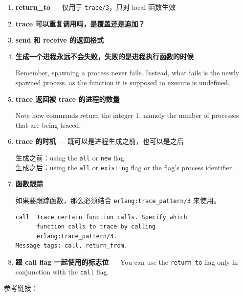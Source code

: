 \documentclass[a4paper,11pt]{article}
\begin{document}
\begin{enumerate}[leftmargin=1.5em]
    If you want a process other than the one calling the trace/3 BIF to receive the trace events, you pass the \lstinline|{tracer, Pid}| tuple as an element in the TraceFlags list.

    \item \textbf{return\_to} --- 仅用于 \lstinline|trace/3|，只对 local 函数生效

    \item \textbf{trace 可以重复调用吗，是覆盖还是追加？}

    \item \textbf{send 和 receive 的返回格式}

    \item \textbf{生成一个进程永远不会失败，失败的是进程执行函数的时候}

    Remember, spawning a process never fails. Instead, what fails is the newly spawned process, as the function it is supposed to execute is undefined.

    \item \textbf{trace 返回被 trace 的进程的数量}

    Note how commands return the integer 1, namely the number of processes that are being traced.

    \item \textbf{trace 的时机} --- 既可以是进程生成之前，也可以是之后

    生成之前：using the \lstinline|all| or \lstinline|new| flag. \\
    生成之后：using the \lstinline|all| or \lstinline|existing| flag or the flag's process identifier.

    \item \textbf{函数跟踪}

    如果要跟踪函数，那么必须结合 \lstinline|erlang:trace_pattern/3| 来使用。
    \begin{lstlisting}
call  Trace certain function calls. Specify which
      function calls to trace by calling
      erlang:trace_pattern/3.
Message tags: call, return_from.
    \end{lstlisting}

    \item \textbf{跟 call flag 一起使用的标志位} --- You can use the \lstinline|return_to| flag only in conjunction with the \lstinline|call| flag.
\end{enumerate}

参考链接：
\end{document}
